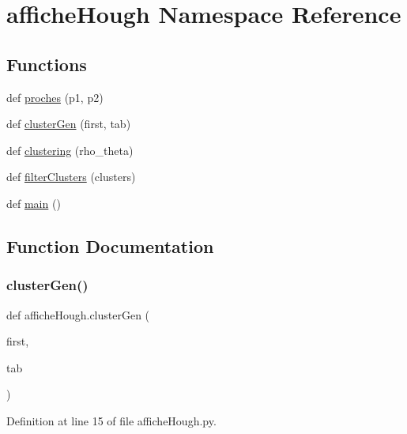 \hypertarget{namespaceaffiche_hough}{}\section{affiche\+Hough Namespace Reference}
\label{namespaceaffiche_hough}
\subsection*{Functions}
\begin{DoxyCompactItemize}
\item 
def \hyperlink{namespaceaffiche_hough_afbc40185dea45de532fd4802d410c08e}{proches} (p1, p2)
\item 
def \hyperlink{namespaceaffiche_hough_acba18e06ffbebf2b6e72e3f766c4aa28}{cluster\+Gen} (first, tab)
\item 
def \hyperlink{namespaceaffiche_hough_a65b7e65c7983fa86c52a80c7d51753d2}{clustering} (rho\+\_\+theta)
\item 
def \hyperlink{namespaceaffiche_hough_aee6613c62eeeb117afce83cfa389b0bb}{filter\+Clusters} (clusters)
\item 
def \hyperlink{namespaceaffiche_hough_a6ab3d25b67fae97c94356d3778aa83ba}{main} ()
\end{DoxyCompactItemize}


\subsection{Function Documentation}
\mbox{\label{namespaceaffiche_hough_acba18e06ffbebf2b6e72e3f766c4aa28}} 
\subsubsection{\texorpdfstring{cluster\+Gen()}{clusterGen()}}
{\footnotesize\ttfamily def affiche\+Hough.\+cluster\+Gen (\begin{DoxyParamCaption}\item[{}]{first,  }\item[{}]{tab }\end{DoxyParamCaption})}



Definition at line 15 of file affiche\+Hough.\+py.

